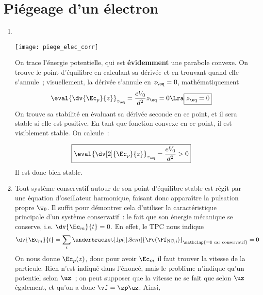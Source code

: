 \documentclass[a4paper, 12pt, final, garamond]{book}
\begin{document}
\section{Piégeage d'un électron}
\begin{enumerate}
    \item 
        \begin{minipage}[t]{0.30\linewidth}
            ~
            \begin{center}
                \texttt{[image: piege\_elec\_corr]}
                \label{fig:piegeelec}
            \end{center}
        \end{minipage}
        \hfill
        \begin{minipage}[t]{0.65\linewidth}
            On trace l'énergie potentielle, qui est \textbf{évidemment} une
            parabole convexe. On trouve le point d'équilibre en calculant sa
            dérivée et en trouvant quand elle s'annule~; visuellement, la
            dérivée s'annule en $z_{\eq} = 0$, mathématiquement
            \[\eval{\dv{\Ec_p}{z}}_{z_{\eq}} = \frac{eV_0}{d^2}z_{\eq} = 0 \Lra
            \boxed{z_{\eq} = 0}\]
            On trouve sa stabilité en évaluant sa dérivée seconde en ce point,
            et il sera stable si elle est positive. En tant que fonction convexe
            en ce point, il est visiblement stable. On calcule~:
        \end{minipage}
        \[\boxed{\eval{\dv[2]{\Ec_p}{z}}_{z_{\eq}} = \frac{eV_0}{d^2} > 0}\]
        Il est donc bien stable.
    \item Tout système conservatif autour de son point d'équilibre stable est
        régit par une équation d'oscillateur harmonique, faisant donc apparaître
        la pulsation propre $\w_0$. Il suffit pour démontrer cela d'utiliser la
        caractéristique principale d'un système conservatif~: le fait que son
        énergie mécanique se conserve, i.e. $\dv{\Ec_m}{t} = 0$. En effet, le
        TPC nous indique
        \[\dv{\Ec_m}{t} = \sum_i \underbracket[1pt][.8em]{\Pc(\Ff_{{\rm
        NC},i})}_{\mathclap{=0\text{ car conservatif}}} = 0\]
        On nous donne $\Ec_p(z)$, donc pour avoir $\Ec_m$ il faut trouver la
        vitesse de la particule. Rien n'est indiqué dans l'énoncé, mais le
        problème n'indique qu'un potentiel selon $\uz$~; on peut supposer que la
        vitesse ne se fait que selon $\uz$ également, et qu'on a donc $\vf =
        \zp\uz$. Ainsi,
        \begin{align*}

\end{align*}
\end{enumerate}
\end{document}
